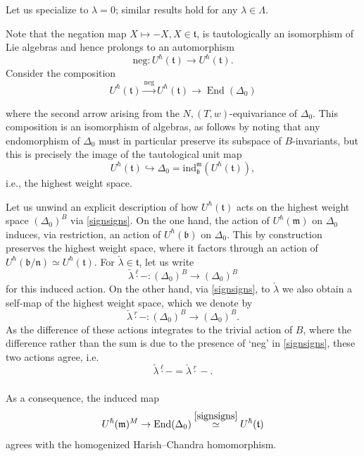 \documentclass{amsart}
\theoremstyle{definition}
\newcommand{\fm}{\mathfrak{m}}
\newcommand{\fb}{\mathfrak{b}}
\newcommand{\sss}{\subsubsection{}}
\newcommand{\ft}{\mathfrak{t}}
\newcommand{\on}{\mathrm}
\newcommand{\End}{\operatorname{End}}
\numberwithin{equation}{section}
\begin{document}
{ \sss  Let us specialize to $\lambda = 0$; similar results hold for any $\lambda \in \Lambda$.} Note that the negation map $X \mapsto -X, X \in \ft$, is tautologically an isomorphism of Lie algebras and hence prolongs to an automorphism $$\on{neg}: U^\hbar(\ft) \rightarrow U^\hbar(\ft).$$
Consider the composition \begin{equation} \label{signsigns} U^\hbar(\ft) \xrightarrow{\on{neg}} U^\hbar(\ft) \rightarrow \End(\Delta_0) \end{equation} {where the second arrow arising from the $N, (T, w)$-equivariance of $\Delta_0$. This composition is an isomorphism of algebras, as follows by noting that any endomorphism of $\Delta_0$ must in particular preserve its subspace of $B$-invariants, but this is precisely the image of the tautological unit map $$U^\hbar(\ft) \hookrightarrow \Delta_0 = \on{ind}_{\mathfrak{b}}^{\mathfrak{m}}(U^\hbar(\ft)),$$i.e., the highest weight space. 


Let us unwind an explicit description of how $U^\hbar(\ft)$ acts on the highest weight space $(\Delta_0)^B$ via \eqref{signsigns}. On the one hand, the action of $U^\hbar(\fm)$ on $\Delta_0$ induces, via restriction, an action of $U^\hbar(\fb)$ on $\Delta_0$. This by construction preserves the highest weight space, where it factors through an action of $U^\hbar(\fb/\mathfrak{n}) \simeq U^\hbar(\ft)$. For $\check{\lambda} \in \ft$, let us write 
$$\check{\lambda} \overset{\ell} \cdot -:  (\Delta_0)^B \rightarrow (\Delta_0)^B$$
for this induced action. On the other hand, via \eqref{signsigns}, to $\check{\lambda}$ we also obtain a self-map of the highest weight space, which we denote by 
$$\check{\lambda} \overset{r} \cdot -: (\Delta_0)^B \rightarrow (\Delta_0)^B.$$As the difference of these actions integrates to the trivial action of $B$, where the difference rather than the sum is due to the presence of `neg' in \eqref{signsigns}, these two actions agree, i.e. 
$$\check{\lambda} \overset{\ell} \cdot - = \check{\lambda} \overset{r} \cdot -.$$

\sss \label{sss:hcstar} As a consequence, the induced map 
\begin{equation} \label{hcsign} U^\hbar(\fm)^M \rightarrow \End(\Delta_0) \overset{\eqref{signsigns}}\simeq  U^\hbar(\ft)\end{equation}
agrees with the homogenized Harish--Chandra homomorphism.  

}
\end{document}
